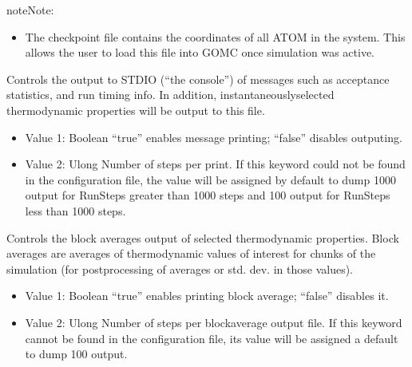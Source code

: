 \documentclass[letterpaper,10pt,english]{sphinxmanual}
\begin{document}
\begin{description}
\begin{itemize}
\end{itemize}

\begin{sphinxadmonition}{note}{Note:}\begin{itemize}
\item {} 
The checkpoint file contains the coordinates of all ATOM in the system. This allows the user to load this file into GOMC once  simulation was active.

\end{itemize}
\end{sphinxadmonition}

\item[{\sphinxcode{\sphinxupquote{ConsoleFreq}}}] \leavevmode
Controls the output to STDIO (“the console”) of messages such as acceptance statistics, and run timing info. In addition, instantaneously\sphinxhyphen{}selected thermodynamic properties will be output to this file.
\begin{itemize}
\item {} 
Value 1: Boolean \sphinxhyphen{} “true” enables message printing; “false” disables outputing.

\item {} 
Value 2: Ulong \sphinxhyphen{} Number of steps per print. If this keyword could not be found in the configuration file, the value will be assigned by default to dump 1000 output for RunSteps greater than 1000 steps and 100 output for RunSteps less than 1000 steps.

\end{itemize}

\item[{\sphinxcode{\sphinxupquote{BlockAverageFreq}}}] \leavevmode
Controls the block averages output of selected thermodynamic properties. Block averages are averages of thermodynamic values of interest for chunks of the simulation (for post\sphinxhyphen{}processing of averages or std. dev. in those values).
\begin{itemize}
\item {} 
Value 1: Boolean \sphinxhyphen{} “true” enables printing block average; “false” disables it.

\item {} 
Value 2: Ulong \sphinxhyphen{} Number of steps per block\sphinxhyphen{}average output file. If this keyword cannot be found in the configuration file, its value will be assigned a default to dump 100 output.

\end{itemize}


\end{description}
\end{document}
